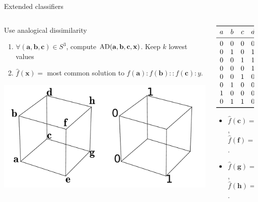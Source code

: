 \documentclass{beamer}
\begin{document}
\begin{frame}{Extended classifiers \cite{BayMicDelIJCAI07}}
  \begin{columns}
    \begin{column}{0.5\textwidth}
  Use \alert{analogical dissimilarity}
    \begin{enumerate}
      \item $\forall (\mathbf{a}, \mathbf{b}, \mathbf{c}) \in S^3$, compute
        $\text{AD}(\mathbf{a}, \mathbf{b}, \mathbf{c}, \mathbf{x})$.
        Keep $k$ lowest values
      \item $\hat{f}(\mathbf{x}) =$ most common solution to $f(\mathbf{a}) :
        f(\mathbf{b}) :: f(\mathbf{c}) : y$.
    \end{enumerate}
      \begin{center}
        \includegraphics[width=.8\textwidth]{figures/ae_example.pdf}
      \end{center}
    \end{column}
    \begin{column}{0.5\textwidth}
      {\tiny
      $$
      \begin{array}{ccccc}
        \toprule
        a & b & c & d &  \AD(a, b, c, d)\\
        \midrule
        0 & 0 & 0 & 0 &   \textbf{0}\\
        0 & 1 & 0 & 1 &   \textbf{0}\\
        0 & 0 & 1 & 1 &   \textbf{0}\\
        0 & 0 & 0 & 1 &   \textbf{1}\\
        0 & 0 & 1 & 0 &   \textbf{1}\\
        0 & 1 & 0 & 0 &   \textbf{1}\\
        1 & 0 & 0 & 0 &   \textbf{1}\\
        0 & 1 & 1 & 0 &   \textbf{2}\\
        \bottomrule
      \end{array}
      $$
      }
      \begin{itemize}
      \item $\hat{f}(\mathbf{c}) = 1$, ~~~
        $\hat{f}(\mathbf{f}) = 1$.
      \item $\hat{f}(\mathbf{g}) = 1$, ~~~
        $\hat{f}(\mathbf{h}) = 1$.
      \end{itemize}
    \end{column}
  \end{columns}
\end{frame}
\end{document}
